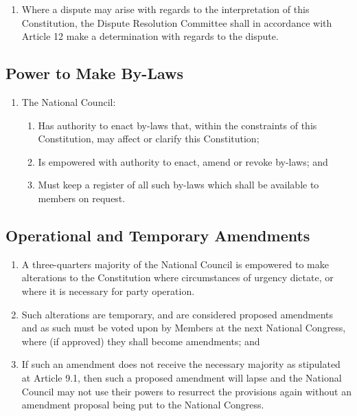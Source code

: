 \documentclass[a4paper,titlepage,8.5pt]{article}
\begin{document}
\begin{enumerate}
\item Where a dispute may arise with regards to the interpretation of this Constitution, the Dispute Resolution Committee shall in accordance with Article 12 make a determination with regards to the dispute.
\end{enumerate}

\subsection{Power to Make By-Laws}

\begin{enumerate}
\item The National Council:
\begin{enumerate}
\item Has authority to enact by-laws that, within the constraints of this Constitution, may affect or clarify this Constitution;
\item Is empowered with authority to enact, amend or revoke by-laws; and
\item Must keep a register of all such by-laws which shall be available to members on request.
\end{enumerate}
\end{enumerate}

\subsection{Operational and Temporary Amendments}

\begin{enumerate}
\item A three-quarters majority of the National Council is empowered to make alterations to the Constitution where circumstances of urgency dictate, or where it is necessary for party operation.
\item Such alterations are temporary, and are considered proposed amendments and as such must be voted upon by Members at the next National Congress, where (if approved) they shall become amendments; and
\item If such an amendment does not receive the necessary majority as stipulated at Article 9.1, then such a proposed amendment will lapse and the National Council may not use their powers to resurrect the provisions again without an amendment proposal being put to the National Congress.
\end{enumerate}
\end{document}
